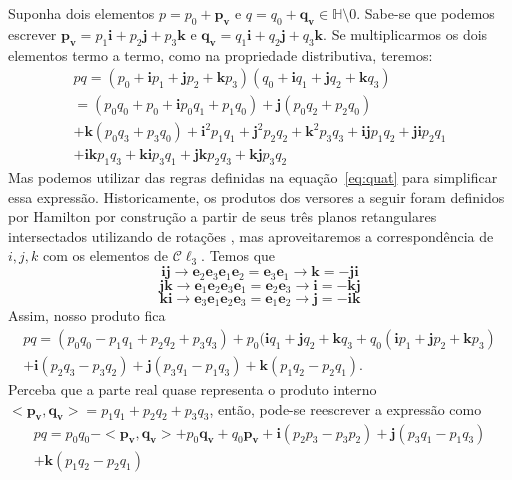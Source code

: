 \documentclass[a4paper,12pt]{report}
\theoremstyle{plain}
\theoremstyle{definition}
\begin{document}
	Suponha dois elementos $p = p_0 + \mathbf{p_v}$ e $q = q_0 + \mathbf{q_v}\in \mathbb{H}\setminus0$. Sabe-se que podemos escrever $\mathbf{p_v} = p_1\mathbf{i} + p_2\mathbf{j} + p_3\mathbf{k}$ e $\mathbf{q_v} = q_1\mathbf{i} + q_2\mathbf{j} + q_3\mathbf{k}$. Se multiplicarmos os dois elementos termo a termo, como na propriedade distributiva, teremos:
	\begin{equation}
		\begin{aligned}
			pq = (p_0+\mathbf{i}p_1+\mathbf{j}p_2+\mathbf{k}p_3)(q_0+\mathbf{i}q_1+\mathbf{j}q_2+\mathbf{k}q_3) \\ = (p_0q_0+p_0+\mathbf{i}p_0q_1+p_1q_0)+\mathbf{j}(p_0q_2+p_2q_0) \\ +\mathbf{k}(p_0q_3+p_3q_0)+\mathbf{i}^2p_1q_1+\mathbf{j}^2p_2q_2+\mathbf{k}^2p_3q_3+\mathbf{ij}p_1q_2+\mathbf{ji}p_2q_1 \\ +\mathbf{ik}p_1q_3+\mathbf{ki}p_3q_1+\mathbf{jk}p_2q_3+\mathbf{kj}p_3q_2
		\end{aligned}		   	       
	\end{equation}
	Mas podemos utilizar das regras definidas na equação~\ref{eq:quat} para simplificar essa expressão. Historicamente, os produtos dos versores a seguir foram definidos por Hamilton por construção a partir de seus três planos retangulares intersectados utilizando de rotações \cite{QuaterniosHamilton}, mas aproveitaremos a correspondência de $i,j,k$ com os elementos de $\mathcal C \ell_3$. Temos que
	\begin{equation*}
		\mathbf{ij} \rightarrow \mathbf e_2\mathbf e_3\mathbf e_1\mathbf e_2 = \mathbf e_3\mathbf e_1 \rightarrow \mathbf{k} = \mathbf{-ji}
	\end{equation*}
	\begin{equation*}
		\mathbf{jk} \rightarrow \mathbf e_1\mathbf e_2\mathbf e_3\mathbf e_1 = \mathbf e_2\mathbf e_3 \rightarrow \mathbf{i} = \mathbf{-kj}
	\end{equation*}
	\begin{equation*}
		\mathbf{ki} \rightarrow \mathbf e_3\mathbf e_1\mathbf e_2\mathbf e_3 = \mathbf e_1\mathbf e_2 \rightarrow \mathbf{j} = \mathbf{-ik}
	\end{equation*}
	Assim, nosso produto fica
	\begin{equation}
		\begin{aligned}
			pq = (p_0q_0-p_1q_1+p_2q_2+p_3q_3)+p_0(\mathbf{i}q_1+\mathbf{j}q_2+\mathbf{k}q_3+q_0(\mathbf{i}p_1+\mathbf{j}p_2+\mathbf{k}p_3) \\ +\mathbf{i}(p_2q_3-p_3q_2)+\mathbf{j}(p_3q_1-p_1q_3)+\mathbf{k}(p_1q_2-p_2q_1).
		\end{aligned}
	\end{equation}
	Perceba que a parte real quase representa o produto interno $<\mathbf{p_v}, \mathbf{q_v}> = p_1q_1 + p_2q_2 + p_3q_3$, então, pode-se reescrever a expressão como
	\begin{equation}
		\begin{aligned}
			pq = p_0q_0-<\mathbf{p_v,q_v}>+p_0\mathbf{q_v}+q_0\mathbf{p_v}+\mathbf{i}(p_2p_3-p_3p_2)+\mathbf{j}(p_3q_1-p_1q_3)\\+\mathbf{k}(p_1q_2-p_2q_1)
		\end{aligned}
	\end{equation}
	
\end{document}
